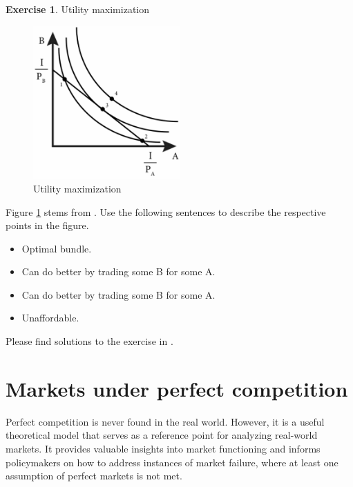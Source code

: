 \documentclass[
  12pt,
  oneside]{book}
\providecommand{\tightlist}{%
  \setlength{\itemsep}{0pt}\setlength{\parskip}{0pt}}
\theoremstyle{definition}
\theoremstyle{definition}
\theoremstyle{definition}
\newtheorem{exercise}{Exercise}[chapter]
\theoremstyle{definition}
\theoremstyle{remark}
\begin{document}
\begin{exercise}
\protect\hypertarget{exr:Umax}{}\label{exr:Umax}Utility maximization

\begin{figure}
\centering
\includegraphics[width=0.5\textwidth,height=\textheight]{fig/utility-max.jpg}
\caption[\label{fig:utilmax} Utility maximization]{\label{fig:utilmax} Utility maximization\footnotemark{}}
\end{figure}

Figure \ref{fig:utilmax} stems from \citet[ch.~4]{Emerson2020Intermediate}. Use the following sentences to describe the respective points in the figure.

\begin{itemize}
\tightlist
\item
  Optimal bundle.
\item
  Can do better by trading some B for some A.
\item
  Can do better by trading some B for some A.
\item
  Unaffordable.
\end{itemize}

Please find solutions to the exercise in \citet[ch.~4]{Emerson2020Intermediate}.
\end{exercise}

\hypertarget{markets-under-perfect-competition}{%
\section{Markets under perfect competition}\label{markets-under-perfect-competition}}

Perfect competition is never found in the real world. However, it is a useful theoretical model that serves as a reference point for analyzing real-world markets. It provides valuable insights into market functioning and informs policymakers on how to address instances of market failure, where at least one assumption of perfect markets is not met.
\end{document}
